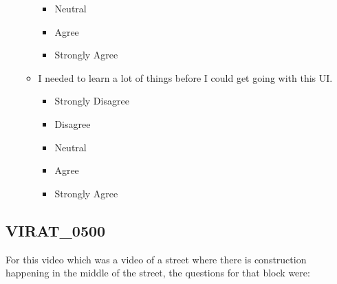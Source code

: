 \documentclass[doublespace,draft,nopageskip]{VTthesis} %
\begin{document}
\begin{itemize}
\begin{itemize}
\begin{itemize}
                \item Neutral
                \item Agree
                \item Strongly Agree
            \end{itemize}
        \item I needed to learn a lot of things before I could get going with this UI.
            \begin{itemize}
                \item Strongly Disagree
                \item Disagree
                \item Neutral
                \item Agree
                \item Strongly Agree
            \end{itemize}
    \end{itemize}
\end{itemize}

\subsection{VIRAT_0500}

For this video which was a video of a street where there is construction happening in the middle of the street, the questions for that block were: 
\end{document}
